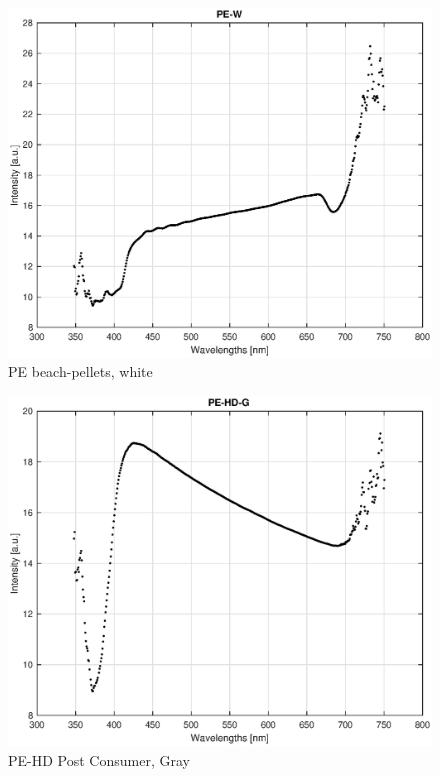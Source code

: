 \begin{appendices}
\begin{figure}
    \centering
    \includegraphics[width = 12cm]{Images/appendix/pe-beach-white.eps}
    \caption{PE beach-pellets, white}
    \label{fig:pe_beach_w}
\end{figure}

\begin{figure}
    \centering
    \includegraphics[width = 12cm]{Images/appendix/pe-hd-postconsum-gray.eps}
    \caption{PE-HD Post Consumer, Gray}
    \label{fig:pehd-gray}
\end{figure}


\end{appendices}
